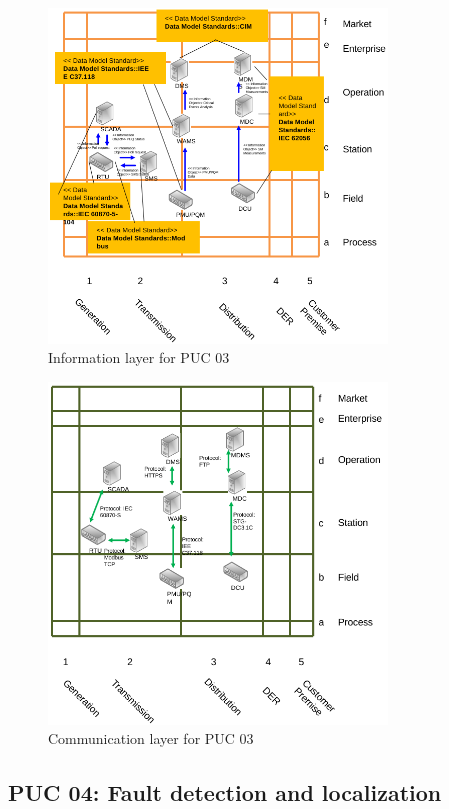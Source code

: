 \begin{figure}[!htb]\centering
  \includegraphics[width=9.0cm]{Data/i3.png}
\caption{Information layer for PUC 03}
\label{fig:i3}
\end{figure}


\begin{figure}[!htb]\centering
  \includegraphics[width=9.0cm]{Data/c3.png}
\caption{Communication layer for PUC 03}
\label{fig:c3}
\end{figure}




\clearpage
\newpage
\subsection*{PUC 04: Fault detection and localization}


